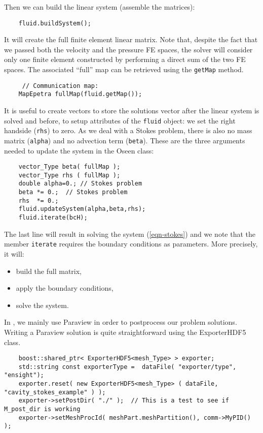 Then we can build the linear system (assemble the matrices):
\begin{verbatim}
    fluid.buildSystem();
\end{verbatim}

\noindent It will create the full finite element linear matrix. Note that, despite the fact
that we passed both the velocity and the pressure FE spaces, the solver will consider
only one finite element constructed by performing a direct sum of the two FE spaces.
The associated ``full'' map can be retrieved using the \verb|getMap| method. 

\begin{verbatim}
     // Communication map: 
    MapEpetra fullMap(fluid.getMap());
\end{verbatim}
\noindent It is useful to create vectors to store the solutions vector after the linear system is solved and before, to setup attributes of the \verb!fluid! object:  we set the right handside (\verb!rhs!) to zero. As we deal with a Stokes problem, there is also no mass matrix (\verb!alpha!) and no advection term (\verb!beta!). These are the three arguments needed to update the system in the Oseen class:\\

\begin{verbatim}
    vector_Type beta( fullMap );
    vector_Type rhs ( fullMap );
    double alpha=0.; // Stokes problem
    beta *= 0.;  // Stokes problem
    rhs  *= 0.;
    fluid.updateSystem(alpha,beta,rhs);
    fluid.iterate(bcH);
\end{verbatim}

 The last line will result in solving the system (\ref{eqn-stokes}) and we note that the member \verb!iterate! requires the boundary conditions
as parameters. More precisely, it will:
\begin{itemize}
\item build the full matrix,
\item apply the boundary conditions,
\item solve the system.
\end{itemize}

In \lifev, we mainly use Paraview in order to postprocess our problem solutions.
Writing a Paraview solution is quite straightforward using the ExporterHDF5 class.

\begin{verbatim}
    boost::shared_ptr< ExporterHDF5<mesh_Type> > exporter;
    std::string const exporterType =  dataFile( "exporter/type", "ensight");
    exporter.reset( new ExporterHDF5<mesh_Type> ( dataFile, "cavity_stokes_example" ) );
    exporter->setPostDir( "./" );  // This is a test to see if M_post_dir is working
    exporter->setMeshProcId( meshPart.meshPartition(), comm->MyPID() );
\end{verbatim}


